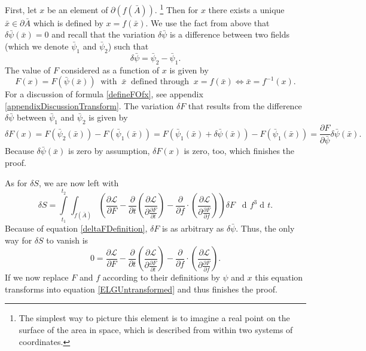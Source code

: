 \documentclass[prb,preprint]{revtex4-1}
\DeclareMathOperator{\dd}{d\!}
\begin{document}
First, let $x$ be an element of $\partial (f(\bar{A}))$.
\footnote{The simplest way to picture this element is to imagine a real point on the surface of the area in space, which is described from within two systems of coordinates.}
Then for $x$ there exists a unique $\bar{x} \in \partial \bar{A}$ which is defined by $x=f(\bar{x})$. We use the fact from above that $\delta \bar{\psi}(\bar{x}) = 0$ and recall that the variation $\delta \bar{\psi}$ is a difference between two fields (which we denote $\bar{\psi}_1$ and $\bar{\psi}_2$) such that
\begin{equation}
\delta \bar{\psi} = \bar{\psi}_2 - \bar{\psi}_1.
\end{equation}
The value of $F$ considered as a function of $x$ is given by 
\begin{equation} \label{defineFOfx}
F(x) = F(\bar{\psi}(\bar{x})) \;\; \text{with} \;\; \bar{x} \;\; \text{defined through} \;\; x=f(\bar{x}) 
\iff \bar{x} = f^{-1}(x).
\end{equation}
For a discussion of formula \eqref{defineFOfx}, see appendix \ref{appendixDiscussionTransform}.
The variation $\delta F$ that results from the difference $\delta \bar{\psi}$ between $\bar{\psi}_1$ and $\bar{\psi}_2$ is given by
\begin{equation}
\delta F(x) = F(\bar{\psi}_2(\bar{x})) - F(\bar{\psi}_1(\bar{x})) 
= F(\bar{\psi}_1(\bar{x}) + \delta \bar{\psi} (\bar{x})) - F(\bar{\psi}_1(\bar{x})) 
= \frac{\partial F}{\partial \bar{\psi}} \delta \bar{\psi} (\bar{x}).
\end{equation}
Because $\delta \bar{\psi}(\bar{x})$ is zero by assumption, $\delta F(x)$ is zero, too, which finishes the proof.

As for $\delta S$, we are now left with
\begin{equation}
\delta S = \int\limits_{t_1}^{t_2} \int_{f(\bar{A})} 
\left(
\frac{\partial \mathcal{L}}{\partial F}
-\frac{\partial}{\partial t} \left( \frac{\partial \mathcal{L}}{\partial \frac{\partial F}{\partial t}} \right) 
-\frac{\partial}{\partial f} \cdot \left( \frac{\partial \mathcal{L}}{\partial \frac{\partial F}{\partial f}} \right)\right) \delta F \;\;
\dd f^3 \dd t.
\end{equation}
Because of equation \eqref{deltaFDefinition}, $\delta F$ is as arbitrary as $\delta \bar{\psi}$. Thus, the only way for $\delta S$ to vanish is
\begin{equation} \label{lastEqToProveInvariance}
0 = 
\frac{\partial \mathcal{L}}{\partial F}
-\frac{\partial}{\partial t} \left( \frac{\partial \mathcal{L}}{\partial \frac{\partial F}{\partial t}} \right) 
-\frac{\partial}{\partial f} \cdot \left( \frac{\partial \mathcal{L}}{\partial \frac{\partial F}{\partial f}} \right).
\end{equation}
If we now replace $F$ and $f$ according to their definitions by $\psi$ and $x$ this equation transforms into equation \eqref{ELGUntransformed} and thus finishes the proof.
\end{document}
